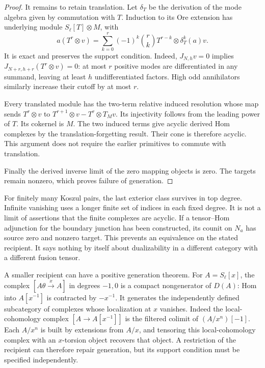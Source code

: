 \begin{proof}
It remains to retain translation. Let $\delta_T$ be the
derivation of the mode algebra given by commutation with
$T$. Induction to its Ore extension has underlying module
$S_\ell[T]\otimes M$, with
\[
 a(T^r\otimes v)=\sum_{k=0}^r(-1)^k\binom rk
                 T^{r-k}\otimes\delta_T^k(a)v.
\]
It is exact and preserves the support condition.
Indeed, $J_{N,h}v=0$ implies
$J_{N+r,h+r}(T^r\otimes v)=0$: at most $r$ positive modes
are differentiated in any summand, leaving at least $h$
undifferentiated factors. High odd annihilators similarly
increase their cutoff by at most $r$.

Every translated module has the two-term relative induced
resolution whose map sends
$T^r\otimes v$ to $T^{r+1}\otimes v-T^r\otimes T_Mv$.
Its injectivity follows from the leading power of $T$.
Its cokernel is $M$. The two induced terms give acyclic
derived Hom complexes by the translation-forgetting result.
Their cone is therefore acyclic. This argument does not
require the earlier primitives to commute with translation.

Finally the derived inverse limit of the zero mapping
objects is zero. The targets remain nonzero, which proves
failure of generation.
\end{proof}

For finitely many Koszul pairs, the last exterior class
survives in top degree. Infinite vanishing uses a longer
finite set of indices in each fixed degree. It is not a
limit of assertions that the finite complexes are acyclic.
If a tensor--Hom adjunction for the boundary junction has
been constructed, its counit on $N_a$ has source zero and
nonzero target. This prevents an equivalence on the stated
recipient. It says nothing by itself about dualizability
in a different category with a different fusion tensor.

A smaller recipient can have a positive generation theorem.
For $A=S_\ell[x]$, the complex
$[A\theta\xrightarrow{x}A]$ in degrees $-1,0$ is a compact
nongenerator of $D(A)$: Hom into $A[x^{-1}]$ is contracted
by $-x^{-1}$. It generates the independently defined
subcategory of complexes whose localization at $x$ vanishes.
Indeed the local-cohomology complex
$[A\to A[x^{-1}]]$ is the filtered colimit of
$(A/x^n)[-1]$. Each $A/x^n$ is built by extensions from
$A/x$, and tensoring this local-cohomology complex with
an $x$-torsion object recovers that object. A restriction
of the recipient can therefore repair generation, but its
support condition must be specified independently.

